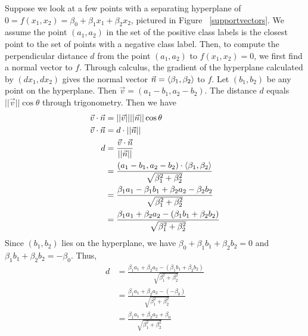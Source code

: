 \documentclass[12pt]{article}
\begin{document}
Suppose we look at a few points with a separating hyperplane of $0=f(x_1,x_2)=\beta_0+\beta_1x_1+\beta_2x_2$, pictured in Figure ~\ref{supportvectors}. We assume the point $(a_1,a_2)$ in the set of the positive class labels is the closest point to the set of points with a negative class label. Then, to compute the perpendicular distance $d$ from the point $(a_1,a_2)$ to $f(x_1,x_2)=0$, we first find a normal vector to $f$. Through calculus, the gradient of the hyperplane calculated by $(dx_1,dx_2)$ gives the normal vector $\vec{n}=\expval{\beta_1, \beta_2}$ to $f$. Let $(b_1,b_2)$ be any point on the hyperplane. Then $\vec{v}=(a_1-b_1,a_2-b_2)$. The distance $d$ equals $||\vec{v}|| \cos{\theta}$ through trigonometry. Then we have
\begin{align*}
    \vec{v} \cdot \vec{n}&=||\vec{v}|| ||\vec{n}|| \cos{\theta} \\
    \vec{v} \cdot \vec{n}&= d \cdot ||\vec{n}|| \\
    d &= \frac{\vec{v} \cdot \vec{n}}{||\vec{n}||} \\
    &= \frac{(a_1-b_1,a_2-b_2) \cdot \expval{\beta_1,\beta_2}}{\sqrt{\beta_1^2+\beta_2^2}} \\
    &=\frac{\beta_1a_1-\beta_1b_1+\beta_2a_2-\beta_2b_2}{\sqrt{\beta_1^2+\beta_2^2}} \\
    &= \frac{\beta_1a_1+\beta_2a_2-(\beta_1b_1+\beta_2b_2)}{\sqrt{\beta_1^2+\beta_2^2}}
\end{align*}
Since $(b_1,b_2)$ lies on the hyperplane, we have $\beta_0+\beta_1b_1+\beta_2b_2=0$ and $\beta_1b_1+\beta_2b_2=-\beta_0$. Thus,
\begin{align*}
    d&= \frac{\beta_1a_1+\beta_2a_2-(\beta_1b_1+\beta_2b_2)}{\sqrt{\beta_1^2+\beta_2^2}} \\
    &= \frac{\beta_1a_1+\beta_2a_2-(-\beta_0)}{\sqrt{\beta_1^2+\beta_2^2}} \\
    &= \frac{\beta_1a_1+\beta_2a_2+\beta_0}{\sqrt{\beta_1^2+\beta_2^2}}
\end{align*}
\end{document}

